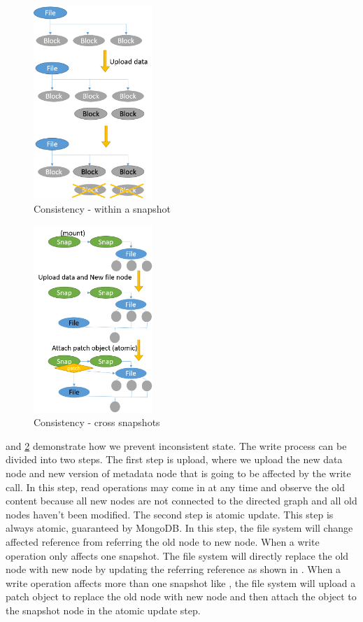 \begin{figure}[t]
\centering
\includegraphics[width=0.4\textwidth]{Chapter-3/figs/fig27.png}
\caption{Consistency - within a snapshot}
\label{fig:consist1}
\end{figure}

\begin{figure}[t]
\centering
\includegraphics[width=0.4\textwidth]{Chapter-3/figs/fig28.png}
\caption{Consistency - cross snapshots}
\label{fig:consist2}
\end{figure}

     and \ref{fig:consist2} demonstrate how we prevent inconsistent state. The write process can be divided into two steps. The first step is upload, where we upload the new data node and new version of metadata node that is going to be affected by the write call. In this step, read operations may come in at any time and observe the old content because all new nodes are not connected to the directed graph and all old nodes haven't been modified. The second step is atomic update. This step is always atomic, guaranteed by MongoDB. In this step, the file system will change affected reference from referring the old node to new node. When a write operation only affects one snapshot. The file system will directly replace the old node with new node by updating the referring reference as shown in . When a write operation affects more than one snapshot like , the file system will upload a patch object to replace the old node with new node and then attach the object to the snapshot node in the atomic update step.

